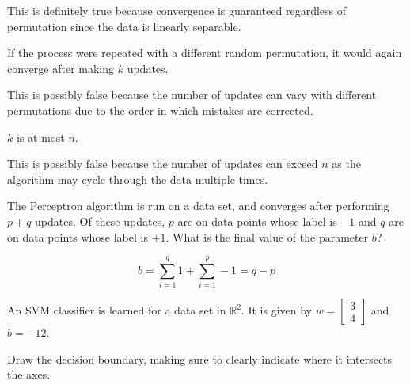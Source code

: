 \documentclass{article}
\newcommand{\R}{\mathbb{R}}
\begin{document}
\begin{probset}
\begin{prob}
\begin{subprobset}
\begin{subprob}
        \begin{soln}
            This is definitely true because convergence is guaranteed regardless of permutation since the data is linearly separable.
        \end{soln}
    \end{subprob}

    \begin{subprob}
        If the process were repeated with a different random permutation, it would again converge after making $k$ updates.
        
        \begin{soln}
            This is possibly false because the number of updates can vary with different permutations due to the order in which mistakes are corrected.
        \end{soln}
    \end{subprob}

    \begin{subprob}
        $k$ is at most $n$.
        
        \begin{soln}
            This is possibly false because the number of updates can exceed $n$ as the algorithm may cycle through the data multiple times.
        \end{soln}
    \end{subprob}
    \end{subprobset}
\end{prob}

\begin{prob}
    The Perceptron algorithm is run on a data set, and converges after performing $p + q$ updates. Of these updates, $p$ are on data points whose label is $-1$ and $q$ are on data points whose label is $+1$. What is the final value of the parameter $b$?

    \begin{soln}
        \[ b = \sum_{i=1}^{q} 1 + \sum_{i=1}^{p} -1 = q - p \]
    \end{soln}
\end{prob}

\newpage

\begin{prob}
    An SVM classifier is learned for a data set in $\R^2$. It is given by $w = \begin{bmatrix} 3 \\ 4 \end{bmatrix}$ and $b = -12$.

    \begin{subprobset}
    \begin{subprob}
        Draw the decision boundary, making sure to clearly indicate where it intersects the axes.


\end{subprob}
\end{subprobset}
\end{prob}
\end{probset}
\end{document}
